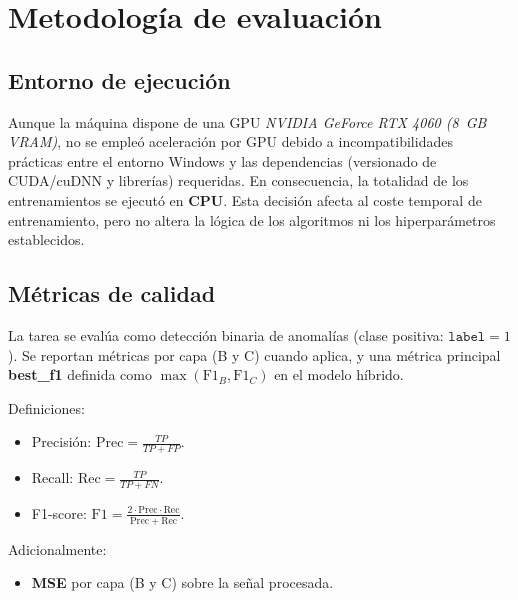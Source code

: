 \section{Metodología de evaluación}

\subsection{Entorno de ejecución} \label{subsec:entorno}
 Aunque la máquina dispone de una GPU \textit{ NVIDIA GeForce RTX 4060 (8~GB VRAM)}, no se empleó aceleración por GPU debido a incompatibilidades prácticas entre el entorno Windows y las dependencias (versionado de CUDA/cuDNN y librerías) requeridas. En consecuencia, la totalidad de los entrenamientos se ejecutó en \textbf{CPU}. Esta decisión afecta al coste temporal de entrenamiento, pero no altera la lógica de los algoritmos ni los hiperparámetros establecidos.

\subsection{Métricas de calidad}
La tarea se evalúa como detección binaria de anomalías (clase positiva: \(\texttt{label} = 1\)). Se reportan métricas por capa (B y C) cuando aplica, y una métrica principal \textbf{best\_f1} definida como \(\max(\text{F1}_B, \text{F1}_C)\) en el modelo híbrido.

Definiciones:
\begin{itemize}
    \item Precisión: \(\mathrm{Prec} = \frac{TP}{TP + FP}\).
    \item Recall: \(\mathrm{Rec} = \frac{TP}{TP + FN}\).
    \item F1-score: \(\mathrm{F1} = \frac{2 \cdot \mathrm{Prec} \cdot \mathrm{Rec}}{\mathrm{Prec} + \mathrm{Rec}}\).
\end{itemize}

Adicionalmente:
\begin{itemize}
    \item \textbf{MSE} por capa (B y C) sobre la señal procesada.
\end{itemize}


